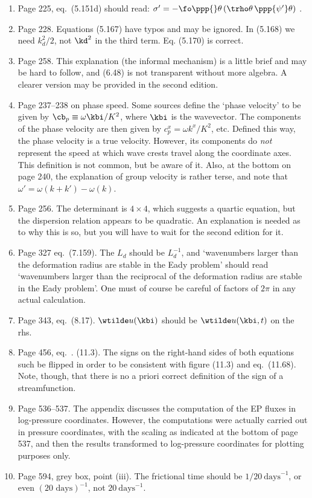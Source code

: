 \documentclass[10pt]{article}
\newcommand{\eq}{eq.\ } \newcommand{\Eq}{Eq.\ }
\begin{document}
\begin{enumerate}
\item Page 225, \eq (5.151d) should read: 
 $ \sigma' =  - \fo \ppp{}\theta \left(\trho \theta \, \ppp{\psi'} \theta \right)$  .

\item Page 228. Equations (5.167) have typos and may be ignored.  In (5.168) we need $k_d^2/2$, not $\kd^2$ in the third term. Eq. (5.170) is correct. 

\item \label{informal} Page 258. This explanation (the informal mechanism) is a little brief and may be hard to follow, and (6.48) is not transparent without more algebra. A clearer version may be provided in the second edition. 

\item Page 237--238 on phase speed. Some sources define the `phase velocity' to be given by $\cb_p \equiv \omega \kbi / K^2$, where $\kbi$ is the wavevector. The components of the phase velocity are then given by $c^x_p = \omega k^x/K^2$, etc. Defined this way, the phase velocity is a true velocity. However, its components do \emph{not} represent the speed at which wave crests travel along the coordinate axes. This definition is not common, but be aware of it. Also, at the bottom on page 240, the explanation of group velocity is rather terse, and note that ${\omega'} = \omega(k+k') - \omega(k)$.

\item Page 256. The determinant is $4\times 4$, which suggests a quartic equation, but the dispersion relation appears to be quadratic. An explanation is needed as to why this is so, but you will have to wait for the second edition for it. 

\item Page 327 \eq (7.159). The $L_d$ should be $L_d^{-1}$, and `wavenumbers larger than the deformation radius are stable in the Eady problem' should read `wavenumbers larger than the reciprocal of the deformation radius are stable in the Eady problem'. One must of course be careful of factors of $2 \pi$ in any actual calculation. 

\item Page 343, \eq (8.17). $\wtilde u(\kbi)$ should be $\wtilde u(\kbi,t)$ on the rhs. 

\item Page 456, \eq. (11.3). The signs on the right-hand sides of both equations such be flipped in order to be consistent with figure (11.3) and \eq (11.68). Note, though, that there is no a priori correct definition of the sign of a streamfunction. 

\item Page 536--537. The appendix discusses the computation of the EP fluxes in log-pressure coordinates. However, the computations were actually carried out in pressure coordinates, with the scaling as indicated at the bottom of page 537, and then the results transformed to log-pressure coordinates for plotting purposes only. 

\item Page 594, grey box, point (iii). The frictional time should be $1/20~ \text{days}^{-1}$, or even $(\text{20 days})^{-1}$, not $20~\text{days}^{-1}$.

\end{enumerate}
\end{document}
